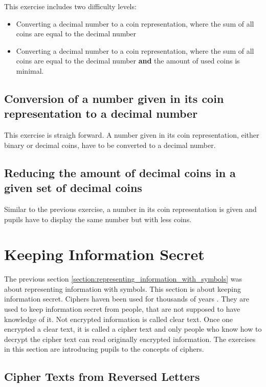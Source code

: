 This exercise includes two difficulty levels:
\begin{itemize}
    \item Converting a decimal number to a coin representation, where the sum of all coins are equal to the decimal number
    \item Converting a decimal number to a coin representation, where the sum of all coins are equal to the decimal number \textbf{and} the amount of used coins is minimal.
\end{itemize}

\subsection*{Conversion of a number given in its coin representation to a decimal number}

This exercise is straigh forward. A number given in its coin representation, either binary or decimal coins, have to be converted to a decimal number. 

\subsection*{Reducing the amount of decimal coins in a given set of decimal coins}

Similar to the previous exercise, a number in its coin representation is given and pupils have to display the same number but with less coins.

\section{Keeping Information Secret}

The previous section \ref{section:representing_information_with_symbols} was about representing information with symbols. This section is about keeping information secret.
Ciphers haven been used for thousands of years \cite{HistoryOfCryptography}. They are used to keep information secret from people, that are not supposed to have knowledge of it. Not encrypted information is called clear text. Once one encrypted a clear text, it is called a cipher text and only people who know how to decrypt the cipher text can read originally encrypted information.
The exercises in this section are introducing pupils to the concepts of ciphers.

\subsection{Cipher Texts from Reversed Letters}

